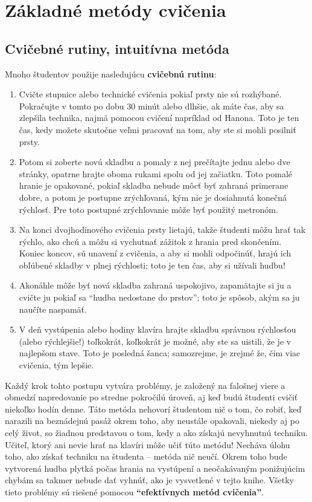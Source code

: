 \documentclass[11pt,a4paper]{book}
\begin{document}
\chapter{Základné metódy cvičenia}\label{s:basic-methods}

\section{Cvičebné rutiny, intuitívna metóda}\label{s:practice-routines}
Mnoho študentov použije nasledujúcu \textbf{cvičebnú rutinu}:

\begin{enumerate}[1.] 
\item Cvičte stupnice alebo technické cvičenia pokiaľ prsty nie sú rozhýbané. Pokračujte v tomto po dobu 30 minút alebo dlhšie, ak máte čas, aby sa zlepšila technika, najmä pomocou cvičení napríklad od Hanona. Toto je ten čas, kedy možete skutočne veľmi pracovať na tom, aby ste si mohli posilniť prsty.
\item Potom si zoberte novú skladbu a pomaly z nej prečítajte jednu alebo dve stránky, opatrne hrajte oboma rukami spolu od jej začiatku. Toto pomalé hranie je opakované, pokiaľ skladba nebude môcť byť zahraná primerane dobre, a potom je postupne zrýchľovaná, kým nie je dosiahnutá konečná rýchlosť. Pre toto postupné zrýchľovanie môže byť použitý metronóm.
\item Na konci dvojhodinového cvičenia prsty lietajú, takže študenti môžu hrať tak rýchlo, ako chcú a môžu si vychutnať zážitok z hrania pred skončením. Koniec koncov, sú unavení z cvičenia, a aby si mohli odpočinúť, hrajú ich obľúbené skladby v plnej rýchlosti; toto je ten čas, aby si užívali hudbu!
\item Akonáhle môže byť nová skladba zahraná uspokojivo, zapamätajte si ju a cvičte ju pokiaľ sa “hudba nedostane do prstov”; toto je spôsob, akým sa ju naučíte naspamäť.
\item V deň vystúpenia alebo hodiny klavíra hrajte skladbu správnou rýchlosťou (alebo rýchlejšie!) toľkokrát, koľkokrát je možné, aby ste sa uistili, že je v najlepšom stave. Toto je posledná šanca; samozrejme, je zrejmé že, čím viac cvičenia, tým lepšie.
\end{enumerate}

Každý krok tohto postupu vytvára problémy, je založený na falošnej viere a obmedzí napredovanie po stredne pokročilú úroveň, aj keď budú študenti cvičiť niekoľko hodín denne. Táto metóda nehovorí študentom nič o tom, čo robiť, keď narazili na beznádejnú pasáž okrem toho, aby neustále opakovali, niekedy aj po celý život, so žiadnou predstavou o tom, kedy a ako získajú nevyhnutnú techniku. Učiteľ, ktorý ani nevie hrať na klavíri môže učiť túto metódu! Necháva úlohu toho, ako získať techniku na ​​študenta – metóda nič neučí. Okrem toho bude vytvorená hudba plytká počas hrania na vystúpení a neočakávaným ponižujúcim chybám sa takmer nebude dať vyhnúť, ako je vysvetlené v tejto knihe. Všetky tieto problémy sú riešené pomocou \textbf{“efektívnych metód cvičenia”}.
\end{document}

